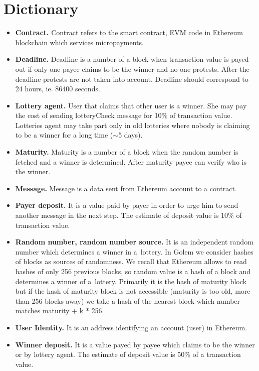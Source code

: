 \documentclass[a4paper]{article}
\begin{document}
\section{Dictionary}
    \begin{itemize}
        \item \textbf{Contract.} Contract refers to the smart contract, EVM code in Ethereum blockchain which
            services micropayments.
        \item \textbf{Deadline.} Deadline is a number of a block when transaction value is payed out if only one
            payee claims to be the winner and no one protests. After the deadline protests are not taken into
            account. Deadline should correspond to 24 hours, ie. 86400 seconds.
        \item \textbf{Lottery agent.} User that claims that other user is a winner. She may pay the cost of sending
            lotteryCheck message for 10\% of transaction value. Lotteries agent may take part only in old lotteries
            where nobody is claiming to be a winner for a long time ($\sim$5 days).
        \item \textbf{Maturity.} Maturity is a number of a block when the random number is fetched and a winner is
            determined. After maturity payee can verify who is the winner.
        \item \textbf{Message.} Message is a data sent from Ethereum account to a contract.
        \item \textbf{Payer deposit.} It is a value paid by payer in order to urge him to send another message in the
            next step. The estimate of deposit value is 10\% of transaction value.
        \item \textbf{Random number, random number source.} It is an independent random number which determines a
            winner in a~lottery. In Golem we consider hashes of blocks as sources of randomness. We recall that
            Ethereum allows to read hashes of only 256 previous blocks, so random value is a hash of a block and
            determines a winner of a~lottery. Primarily it is the hash of maturity block but if the hash of maturity
            block is not accessible (maturity is too old, more than 256 blocks away) we take a hash of the nearest
            block which number matches maturity + k * 256.
        \item \textbf{User Identity.} It is an address identifying an account (user) in Ethereum.
        \item \textbf{Winner deposit.} It is a value payed by payee which claims to be the winner or by lottery
            agent.  The estimate of deposit value is 50\% of a transaction value.
    \end{itemize}
\end{document}

